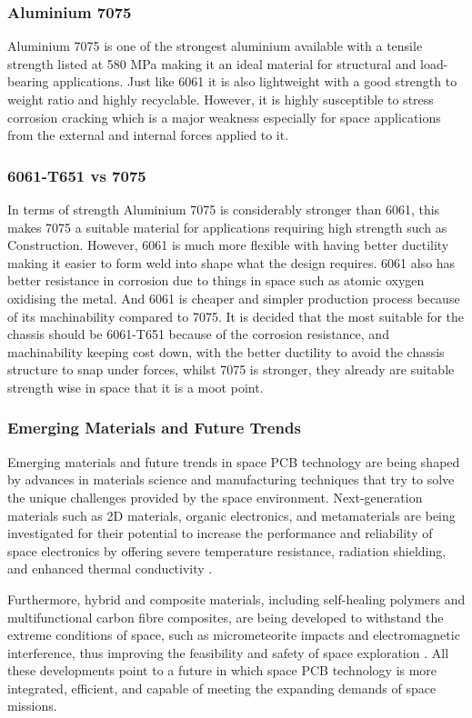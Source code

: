 \subsubsection{Aluminium 7075}
Aluminium 7075 is one of the strongest aluminium available with a tensile strength listed at 580 MPa making it an ideal material for structural and load-bearing applications. 
Just like 6061 it is also lightweight with a good strength to weight ratio and highly recyclable. 
However, it is highly susceptible to stress corrosion cracking which is a major weakness especially for space applications from the external and internal forces applied to it.

\subsubsection{6061-T651 vs  7075}
In terms of strength Aluminium 7075 is considerably stronger than 6061, this makes 7075 a suitable material for applications requiring high strength such as Construction. 
However, 6061 is much more flexible with having better ductility making it easier to form weld into shape what the design requires. 
6061 also has better resistance in corrosion due to things in space such as atomic oxygen oxidising the metal. 
And 6061 is cheaper and simpler production process because of its machinability compared to 7075. 
It is decided that the most suitable for the chassis should be 6061-T651 because of the corrosion resistance, and machinability keeping cost down, with the better ductility to avoid the chassis structure to snap under forces, whilst 7075 is stronger, they already are suitable strength wise in space that it is a moot point.

\subsubsection{Emerging Materials and Future Trends} 
Emerging materials and future trends in space PCB technology are being shaped by advances in materials science and manufacturing techniques that try to solve the unique challenges provided by the space environment. 
Next-generation materials such as 2D materials, organic electronics, and metamaterials are being investigated for their potential to increase the performance and reliability of space electronics by offering severe temperature resistance, radiation shielding, and enhanced thermal conductivity \cite{RefWorks:ona-olapo2024next-generation}.

Furthermore, hybrid and composite materials, including self-healing polymers and multifunctional carbon fibre composites, are being developed to withstand the extreme conditions of space, such as micrometeorite impacts and electromagnetic interference, thus improving the feasibility and safety of space exploration \cite{RefWorks:ince2023overview}. 
All these developments point to a future in which space PCB technology is more integrated, efficient, and capable of meeting the expanding demands of space missions.

